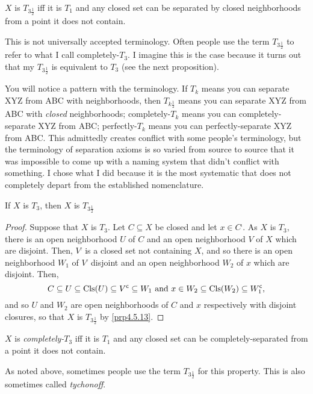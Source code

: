 \begin{dfn}[$T_{3\frac{1}{2}}$]\label{T312}
$X$ is \emph{$T_{3\frac{1}{2}}$} iff it is $T_1$ and any closed set can be separated by closed neighborhoods from a point it does not contain.
\begin{rmk}
This is not universally accepted terminology.  Often people use the term $T_{3\frac{1}{2}}$ to refer to what I call completely-$T_3$.  I imagine this is the case because it turns out that my $T_{3\frac{1}{2}}$ is equivalent to $T_3$ (see the next proposition).
\end{rmk}
\begin{rmk}
You will notice a pattern with the terminology.  If $T_k$ means you can separate XYZ from ABC with neighborhoods, then $T_{k\frac{1}{2}}$ means you can separate XYZ from ABC with \emph{closed} neighborhoods; completely-$T_k$ means you can completely-separate XYZ from ABC; perfectly-$T_k$ means you can perfectly-separate XYZ from ABC.  This admittedly creates conflict with some people's terminology, but the terminology of separation axioms is so varied from source to source that it was impossible to come up with a naming system that didn't conflict with something.  I chose what I did because it is the most systematic that does not completely depart from the established nomenclature.
\end{rmk}
\end{dfn}
\begin{prp}\label{prp4.5.70}
If $X$ is $T_3$, then $X$ is $T_{3\frac{1}{2}}$
\begin{proof}
Suppose that $X$ is $T_3$.  Let $C\subseteq X$ be closed and let $x\in C^{\comp}$.  As $X$ is $T_3$, there is an open neighborhood $U$ of $C$ and an open neighborhood $V$ of $X$ which are disjoint.  Then, $V^{\comp}$ is a closed set not containing $X$, and so there is an open neighborhood $W_1$ of $V^{\comp}$ disjoint and an open neighborhood $W_2$ of $x$ which are disjoint.  Then,
\begin{equation}
C\subseteq U\subseteq \operatorname{Cls} (U)\subseteq V^{\mathsf{c}}\subseteq W_1\text{ and }x\in W_2\subseteq \operatorname{Cls} (W_2)\subseteq W_1^{\mathsf{c}},
\end{equation}
and so $U$ and $W_2$ are open neighborhoods of $C$ and $x$ respectively with disjoint closures, so that $X$ is $T_{3\frac{1}{2}}$ by \cref{prp4.5.13}.
\end{proof}
\end{prp}
\begin{dfn}[Completely-$T_3$]\label{CompletelyT3}
$X$ is \emph{completely-$T_3$} iff it is $T_1$ and any closed set can be completely-separated from a point it does not contain.
\begin{rmk}
As noted above, sometimes people use the term $T_{3\frac{1}{2}}$ for this property.  This is also sometimes called \emph{tychonoff}.
\end{rmk}
\end{dfn}
